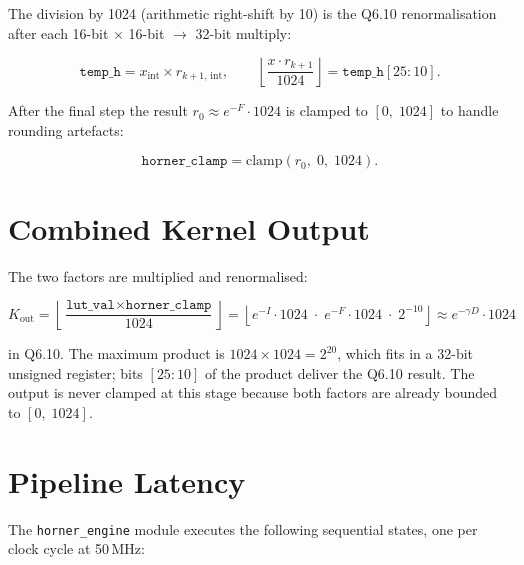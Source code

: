 \documentclass[11pt,a4paper]{article}
\begin{document}
The division by 1024 (arithmetic right-shift by 10) is the Q6.10 renormalisation
after each 16-bit $\times$ 16-bit $\rightarrow$ 32-bit multiply:

\begin{equation}
  \texttt{temp\_h} = x_\text{int} \times r_{k+1,\,\text{int}},
  \qquad
  \left\lfloor \frac{x \cdot r_{k+1}}{1024}\right\rfloor
    = \texttt{temp\_h}[25\!:\!10].
  \label{eq:shift}
\end{equation}

After the final step the result $r_0 \approx e^{-F} \cdot 1024$ is clamped to
$[0,\;1024]$ to handle rounding artefacts:

\begin{equation}
  \texttt{horner\_clamp} = \text{clamp}(r_0,\; 0,\; 1024).
  \label{eq:clamp}
\end{equation}

\section{Combined Kernel Output}

The two factors are multiplied and renormalised:

\begin{equation}
  \boxed{
    K_\text{out}
    = \left\lfloor \frac{\texttt{lut\_val} \times \texttt{horner\_clamp}}{1024} \right\rfloor
    = \left\lfloor e^{-I}\cdot 1024 \;\cdot\; e^{-F}\cdot 1024 \;\cdot\; 2^{-10} \right\rfloor
    \approx e^{-\gamma D} \cdot 1024
  }
  \label{eq:kout}
\end{equation}

in Q6.10.  The maximum product is $1024 \times 1024 = 2^{20}$, which fits in a
32-bit unsigned register; bits $[25:10]$ of the product deliver the Q6.10
result.  The output is never clamped at this stage because both factors are
already bounded to $[0,\;1024]$.

\section{Pipeline Latency}

The \texttt{horner\_engine} module executes the following sequential states,
one per clock cycle at 50\,MHz:
\end{document}
